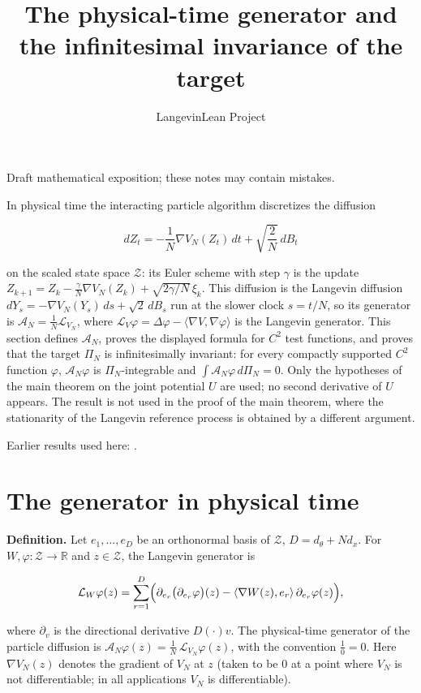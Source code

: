 \documentclass[11pt,a4paper]{article}
\title{\texorpdfstring{The physical-time generator and the infinitesimal invariance of the target}{The physical-time generator and the infinitesimal invariance of the target}}
\author{LangevinLean Project}
\date{}
\begin{document}
\maketitle
Draft mathematical exposition; these notes may contain mistakes.


In physical time the interacting particle algorithm discretizes the diffusion


\[dZ_t=-\frac1N\nabla V_N(Z_t)\,dt+\sqrt{\frac2N}\,dB_t\]


on the scaled state space \(\mathcal Z\): its Euler scheme with step \(\gamma\) is the update \(Z_{k+1}=Z_k-\frac\gamma N\nabla V_N(Z_k)+\sqrt{2\gamma/N}\,\xi_k\). This diffusion is the Langevin diffusion \(dY_s=-\nabla V_N(Y_s)\,ds+\sqrt2\,dB_s\) run at the slower clock \(s=t/N\), so its generator is \(\mathcal A_N=\frac1N\mathcal L_{V_N}\), where \(\mathcal L_V\varphi=\Delta\varphi-\langle\nabla V,\nabla\varphi\rangle\) is the Langevin generator. This section defines \(\mathcal A_N\), proves the displayed formula for \(C^2\) test functions, and proves that the target \(\Pi_N\) is infinitesimally invariant: for every compactly supported \(C^2\) function \(\varphi\), \(\mathcal A_N\varphi\) is \(\Pi_N\)-integrable and \(\int\mathcal A_N\varphi\,d\Pi_N=0\). Only the hypotheses of the main theorem on the joint potential \(U\) are used; no second derivative of \(U\) appears. The result is not used in the proof of the main theorem, where the stationarity of the Langevin reference process is obtained by a different argument.



Earlier results used here: \cite[Section~3.46]{LangevinLean2026ULASC}.

\section{\texorpdfstring{The generator in physical time}{The generator in physical time}}


\textbf{Definition.} Let \(e_1,\dots,e_D\) be an orthonormal basis of \(\mathcal Z\), \(D=d_\theta+Nd_x\). For \(W,\varphi:\mathcal Z\to\mathbb R\) and \(z\in\mathcal Z\), the Langevin generator is


\[\mathcal L_W\varphi(z)=\sum_{r=1}^D\Bigl(\partial_{e_r}\bigl(\partial_{e_r}\varphi\bigr)(z)-\langle\nabla W(z),e_r\rangle\,\partial_{e_r}\varphi(z)\Bigr),\]


where \(\partial_v\) is the directional derivative \(D(\cdot)v\). The physical-time generator of the particle diffusion is \(\mathcal A_N\varphi(z)=\frac1N\,\mathcal L_{V_N}\varphi(z)\), with the convention \(\frac10=0\). Here \(\nabla V_N(z)\) denotes the gradient of \(V_N\) at \(z\) (taken to be \(0\) at a point where \(V_N\) is not differentiable; in all applications \(V_N\) is differentiable).
\end{document}
